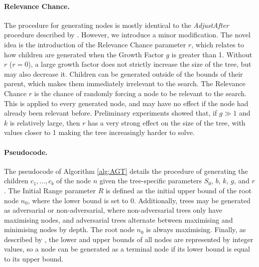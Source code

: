 \paragraph{Relevance Chance.} The procedure for generating nodes is mostly identical to the \textit{AdjustAfter} procedure described by .
However, we introduce a minor modification. The novel idea is the introduction of the Relevance Chance parameter $r$, which relates to how children are generated when the Growth Factor $g$ is greater than 1. Without $r$ ($r=0$), a large growth factor does not strictly increase the size of the tree, but may also decrease it. Children can be generated outside of the bounds of their parent, which makes them immediately irrelevant to the search.
The Relevance Chance $r$ is the chance of randomly forcing a node to be relevant to the search. This is applied to every generated node, and may have no effect if the node had already been relevant before.
Preliminary experiments showed that, if $g\gg 1$ and $k$ is relatively large, then $r$ has a very strong effect on the size of the tree, with values closer to 1 making the tree increasingly harder to solve.
\newpage
\paragraph{Pseudocode.} The pseudocode of Algorithm \ref{alg:AGT} details the procedure of generating the children $c_1,\dots,c_b$ of the node $n$ given the tree-specific parameters $S_0$, $b$, $k$, $g$, and $r$. The Initial Range parameter $R$ is defined as the initial upper bound of the root node $n_0$, where the lower bound is set to $0$. Additionally, trees may be generated as adversarial or non-adversarial, where non-adversarial trees only have maximising nodes, and adversarial trees alternate between maximising and minimising nodes by depth. The root node $n_0$ is always maximising.
Finally, as described by , the lower and upper bounds of all nodes are represented by integer values, so a node can be generated as a terminal node if its lower bound is equal to its upper bound.

\vspace{4ex}

